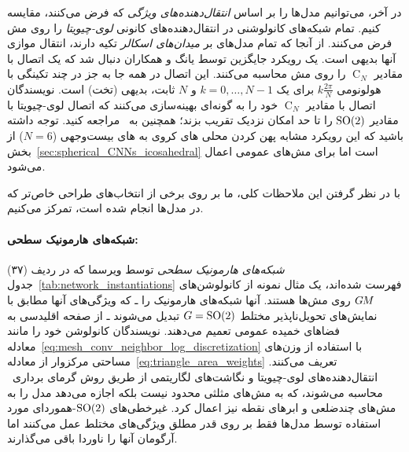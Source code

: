 در آخر، می‌توانیم مدل‌ها را بر اساس \emph{انتقال‌دهنده‌های ویژگی} که فرض می‌کنند، مقایسه کنیم.
تمام شبکه‌های کانولوشنی در \cite{Wiersma2020,poulenard2018multi,sun2018zernet,deHaan2020meshCNNs} انتقال‌دهنده‌های کانونی \emph{لوی-چیویتا} را روی مش فرض می‌کنند.
از آنجا که تمام مدل‌های \cite{masci2015geodesic,monti2017geometric,sun2018zernet,huang2019texturenet} بر \emph{میدان‌های اسکالر} تکیه دارند، انتقال موازی آنها بدیهی است.
یک رویکرد جایگزین توسط یانگ و همکاران\cite{Yang2020parallelFrameCNN} دنبال شد که یک اتصال با مقادیر $\operatorname{C}_N$ را روی مش محاسبه می‌کنند.
این اتصال در همه جا به جز در چند تکینگی با هولونومی $k\frac{2\pi}{N}$ برای یک $k=0,\dots,N-1$ و $N$ ثابت، بدیهی (تخت) است.
نویسندگان اتصال با مقادیر $\operatorname{C}_N$ خود را به گونه‌ای بهینه‌سازی می‌کنند که اتصال لوی-چیویتا با مقادیر $\operatorname{SO}(2)$ را تا حد امکان نزدیک تقریب بزند؛ همچنین به~\cite{craneTrivialConnectionsDiscrete2010} مراجعه کنید.
توجه داشته باشید که این رویکرد مشابه پهن کردن محلی های کروی به های بیست‌وجهی ($N=6$) از بخش~\ref{sec:spherical_CNNs_icosahedral} است اما برای مش‌های عمومی اعمال می‌شود.




با در نظر گرفتن این ملاحظات کلی، ما بر روی برخی از انتخاب‌های طراحی خاص‌تر که در مدل‌ها انجام شده است، تمرکز می‌کنیم.


\paragraph{شبکه‌های هارمونیک سطحی:}
\emph{شبکه‌های هارمونیک سطحی} توسط ویرسما\cite{Wiersma2020} که در ردیف (۳۷) جدول~\ref{tab:network_instantiations} فهرست شده‌اند،
یک مثال نمونه از کانولوشن‌های $G\mkern-1.4muM$ روی مش‌ها هستند.
آنها شبکه‌های هارمونیک \cite{Worrall2017-HNET} را ـ که ویژگی‌های آنها مطابق با نمایش‌های تحویل‌ناپذیر مختلط $G=\operatorname{SO}(2)$ تبدیل می‌شوند ـ از صفحه اقلیدسی به فضاهای خمیده عمومی تعمیم می‌دهند.
نویسندگان کانولوشن خود را مانند معادله~\eqref{eq:mesh_conv_neighbor_log_discretization} با استفاده از وزن‌های مساحتی مرکزوار از معادله~\eqref{eq:triangle_area_weights} تعریف می‌کنند.
انتقال‌دهنده‌های لوی-چیویتا و نگاشت‌های لگاریتمی از طریق روش گرمای برداری~\cite{Sharp2019VectorHeatMethod} محاسبه می‌شوند، که به مش‌های مثلثی محدود نیست بلکه اجازه می‌دهد مدل را به مش‌های چندضلعی و ابرهای نقطه نیز اعمال کرد.
غیرخطی‌های $\operatorname{SO}(2)$-هموردای مورد استفاده توسط مدل‌ها فقط بر روی قدر مطلق ویژگی‌های مختلط عمل می‌کنند اما آرگومان آنها را ناوردا باقی می‌گذارند.

